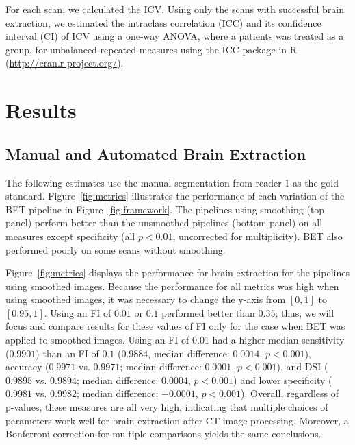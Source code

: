\documentclass{elsarticle}\usepackage[]{graphicx}\usepackage[]{color}
\begin{document}
For each scan, we calculated the ICV.  Using only the scans with successful brain extraction, we estimated the intraclass correlation (ICC) and its confidence interval (CI) of ICV using a one-way ANOVA, where a patients was treated as a group, for unbalanced repeated measures \citep{searle_linear_2012, thomas_interval_1978, donner_use_1979, lessells_unrepeatable_1987} using the ICC package \citep{wolak_guidelines_2012} in R (\url{http://cran.r-project.org/}).  



\section{Results}
\subsection{Manual and Automated Brain Extraction}
The following estimates use the manual segmentation from reader 1 as the gold standard. Figure~\ref{fig:metrics}\protect{} illustrates the performance of each variation of the BET pipeline in Figure~\ref{fig:framework}.  The pipelines using smoothing (top panel) perform better than the unsmoothed pipelines (bottom panel) on all measures except specificity (all $p < 0.01$, uncorrected for multiplicity).  BET also performed poorly on some scans without smoothing.  

Figure~\ref{fig:metrics}\protect{} displays the performance for brain extraction for the pipelines using smoothed images.   Because the performance for all metrics was high when using smoothed images, it was necessary to change the y-axis from $[0,1]$ to $[0.95,1]$. 
Using an FI of $0.01$ or $0.1$ performed better than $0.35$; thus, we will focus and compare results for these values of FI only for the case when BET was applied to smoothed images.  Using an FI of $0.01$ had a higher median sensitivity ($0.9901$) than an FI of $0.1$ ($0.9884$, median difference: $0.0014$, $p< 0.001$), accuracy ($0.9971$ vs. $0.9971$; median difference: $0.0001$, $p< 0.001$), and DSI ($0.9895$ vs. $0.9894$; median difference: $0.0004$, $p< 0.001$) and lower specificity ($0.9981$ vs. $0.9982$; median difference: $-0.0001$, $p< 0.001$).  Overall, regardless of p-values, these measures are all very high, indicating that multiple choices of parameters work well for brain extraction after CT image processing.  Moreover, a Bonferroni correction for multiple comparisons yields the same conclusions. 
\end{document}
